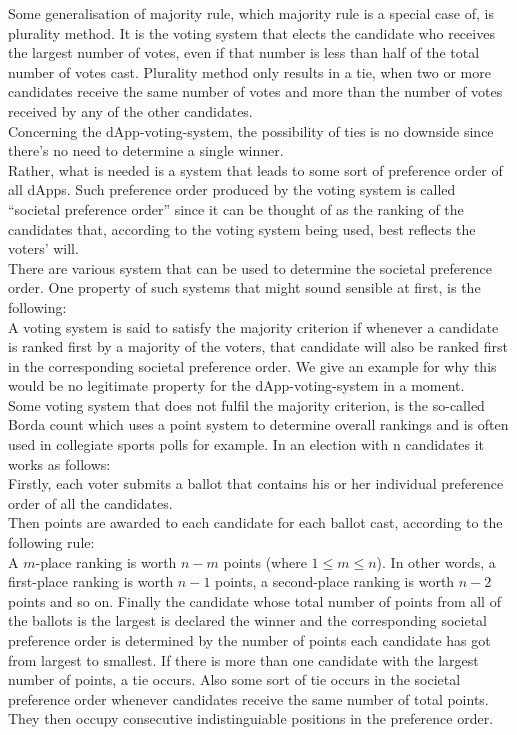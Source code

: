 
Some generalisation of majority rule, which majority rule is a special case of, is plurality method. It is the voting system that elects the candidate who receives the largest number of votes, even if that number is less than half of the total number of votes cast. Plurality method only results in a tie, when two or more candidates receive the same number of votes and more than the number of votes received by any of the other candidates. \\
Concerning the dApp-voting-system, the possibility of ties is no downside since there's no need to determine a single winner.\\ %
Rather, what is needed is a system that leads to some sort of preference order of all dApps. Such preference order produced by the voting system is called ``societal preference order'' since it can be thought of as the ranking of the candidates that, according to the voting system being used, best reflects the voters' will. \\
There are various system that can be used to determine the societal preference order. One property of such systems that might sound sensible at first, is the following: \\
A voting system is said to satisfy the majority criterion if whenever a candidate is ranked first by a majority of the voters, that candidate will also be ranked first in the corresponding societal preference order. We give an example for why this would be no legitimate property for the dApp-voting-system in a moment.\\
Some voting system that does not fulfil the majority criterion, is the so-called Borda count which uses a point system to determine overall rankings and is often used in collegiate sports polls for example. In an election with n candidates it works as follows: \\
Firstly, each voter submits a ballot that contains his or her individual preference order of all the candidates. \\
Then points are awarded to each candidate for each ballot cast, according to the following rule: \\
A $m$-place ranking is worth $n-m$ points (where $1\leq m \leq n$). In other words, a first-place ranking is worth $n-1$ points, a second-place ranking is worth $n-2$ points and so on. 
Finally the candidate whose total number of points from all of the ballots is the largest is declared the winner and the corresponding societal preference order is determined by the number of points each candidate has got from largest to smallest. If there is more than one candidate with the largest number of points, a tie occurs. Also some sort of tie occurs in the societal preference order whenever candidates receive the same number of total points. They then occupy consecutive indistinguiable positions in the preference order. \\
